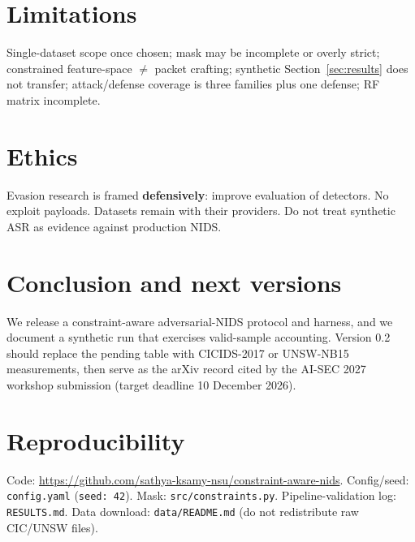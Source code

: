 \documentclass[11pt,a4paper]{article}
\begin{document}
\section{Limitations}
Single-dataset scope once chosen; mask may be incomplete or overly strict; constrained feature-space $\neq$ packet crafting; synthetic Section~\ref{sec:results} does not transfer; attack/defense coverage is three families plus one defense; RF matrix incomplete.

\section{Ethics}
Evasion research is framed \textbf{defensively}: improve evaluation of detectors. No exploit payloads. Datasets remain with their providers. Do not treat synthetic ASR as evidence against production NIDS.

\section{Conclusion and next versions}
We release a constraint-aware adversarial-NIDS protocol and harness, and we document a synthetic run that exercises valid-sample accounting. Version 0.2 should replace the pending table with CICIDS-2017 or UNSW-NB15 measurements, then serve as the arXiv record cited by the AI-SEC 2027 workshop submission (target deadline 10 December 2026).

\section*{Reproducibility}
Code: \url{https://github.com/sathya-ksamy-nsu/constraint-aware-nids}.
Config/seed: \texttt{config.yaml} (\texttt{seed: 42}).
Mask: \texttt{src/constraints.py}.
Pipeline-validation log: \texttt{RESULTS.md}.
Data download: \texttt{data/README.md} (do not redistribute raw CIC/UNSW files).
\end{document}
